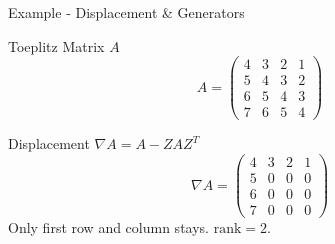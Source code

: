 \begin{frame}{Example - Displacement \& Generators}
      \begin{block}{Toeplitz Matrix $A$}
        \[
          A = \begin{pmatrix}
            4 & 3 & 2 & 1 \\
            5 & 4 & 3 & 2 \\
            6 & 5 & 4 & 3 \\
            7 & 6 & 5 & 4
          \end{pmatrix}
        \]
      \end{block}
      \begin{block}{Displacement $\nabla A = A - ZAZ^T$}
        \[
          \nabla A = \begin{pmatrix}
            4 & 3 & 2 & 1 \\
            5 & 0 & 0 & 0 \\
            6 & 0 & 0 & 0 \\
            7 & 0 & 0 & 0
          \end{pmatrix}
        \]
        Only first row and column stays. $\mathrm{rank} = 2$.
      \end{block}
\end{frame}